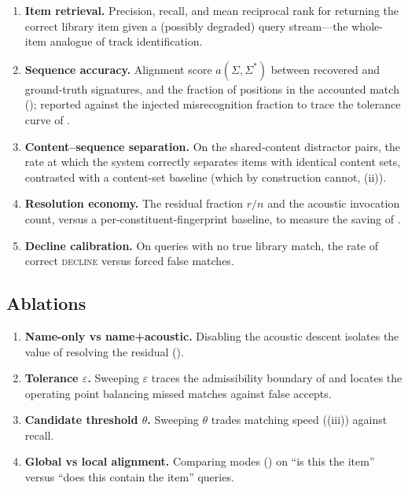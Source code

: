 \documentclass[11pt,twocolumn,a4paper]{article}
\theoremstyle{thmstyle}
\theoremstyle{definition}
\theoremstyle{remark}
\newcommand{\sig}{\Sigma}
\newcommand{\algn}{a}
\newcommand{\eps}{\varepsilon}
\begin{document}
\begin{enumerate}[leftmargin=1.4em,itemsep=2pt]
\item \textbf{Item retrieval.} Precision, recall, and mean reciprocal rank for
returning the correct library item given a (possibly degraded) query stream---the
whole-item analogue of track identification.
\item \textbf{Sequence accuracy.} Alignment score $\algn(\sig,\sig^{\ast})$
between recovered and ground-truth signatures, and the fraction of positions in
the accounted match (); reported against the injected
misrecognition fraction to trace the tolerance curve of .
\item \textbf{Content--sequence separation.} On the shared-content distractor
pairs, the rate at which the system correctly separates items with identical
content sets, contrasted with a content-set baseline (which by construction
cannot, (ii)).
\item \textbf{Resolution economy.} The residual fraction $r/n$ and the acoustic
invocation count, versus a per-constituent-fingerprint baseline, to measure the
saving of .
\item \textbf{Decline calibration.} On queries with no true library match, the
rate of correct \textsc{decline} versus forced false matches.
\end{enumerate}

\subsection{Ablations}

\begin{enumerate}[leftmargin=1.4em,itemsep=2pt]
\item \textbf{Name-only vs name+acoustic.} Disabling the acoustic descent
isolates the value of resolving the residual ().
\item \textbf{Tolerance $\eps$.} Sweeping $\eps$ traces the admissibility
boundary of  and locates the operating point balancing
missed matches against false accepts.
\item \textbf{Candidate threshold $\theta$.} Sweeping $\theta$ trades matching
speed ((iii)) against recall.
\item \textbf{Global vs local alignment.} Comparing modes
() on ``is this the item'' versus ``does this contain the item''
queries.
\end{enumerate}
\end{document}
